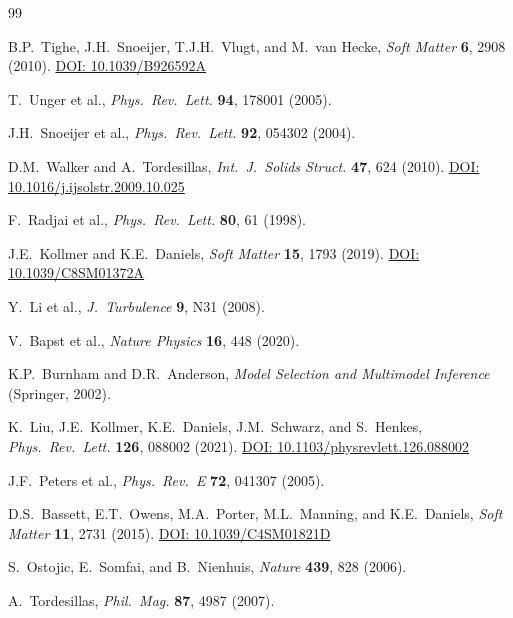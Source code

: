 \documentclass[11pt,a4paper]{article}
\begin{document}
\begin{thebibliography}{99}

B.P.~Tighe, J.H.~Snoeijer, T.J.H.~Vlugt, and M.~van Hecke,
\textit{Soft Matter} \textbf{6}, 2908 (2010).
\href{https://doi.org/10.1039/B926592A}{DOI: 10.1039/B926592A}

T.~Unger et al.,
\textit{Phys.\ Rev.\ Lett.} \textbf{94}, 178001 (2005).

J.H.~Snoeijer et al.,
\textit{Phys.\ Rev.\ Lett.} \textbf{92}, 054302 (2004).

D.M.~Walker and A.~Tordesillas,
\textit{Int.\ J.\ Solids Struct.} \textbf{47}, 624 (2010).
\href{https://doi.org/10.1016/j.ijsolstr.2009.10.025}{DOI: 10.1016/j.ijsolstr.2009.10.025}

F.~Radjai et al.,
\textit{Phys.\ Rev.\ Lett.} \textbf{80}, 61 (1998).

J.E.~Kollmer and K.E.~Daniels,
\textit{Soft Matter} \textbf{15}, 1793 (2019).
\href{https://doi.org/10.1039/C8SM01372A}{DOI: 10.1039/C8SM01372A}

Y.~Li et al.,
\textit{J.~Turbulence} \textbf{9}, N31 (2008).

V.~Bapst et al.,
\textit{Nature Physics} \textbf{16}, 448 (2020).

K.P.~Burnham and D.R.~Anderson,
\textit{Model Selection and Multimodel Inference} (Springer, 2002).

K.~Liu, J.E.~Kollmer, K.E.~Daniels, J.M.~Schwarz, and S.~Henkes,
\textit{Phys.\ Rev.\ Lett.} \textbf{126}, 088002 (2021).
\href{https://doi.org/10.1103/physrevlett.126.088002}{DOI: 10.1103/physrevlett.126.088002}

J.F.~Peters et al.,
\textit{Phys.\ Rev.\ E} \textbf{72}, 041307 (2005).

D.S.~Bassett, E.T.~Owens, M.A.~Porter, M.L.~Manning, and K.E.~Daniels,
\textit{Soft Matter} \textbf{11}, 2731 (2015).
\href{https://doi.org/10.1039/C4SM01821D}{DOI: 10.1039/C4SM01821D}

S.~Ostojic, E.~Somfai, and B.~Nienhuis,
\textit{Nature} \textbf{439}, 828 (2006).

A.~Tordesillas,
\textit{Phil.\ Mag.} \textbf{87}, 4987 (2007).

\end{thebibliography}
\end{document}
